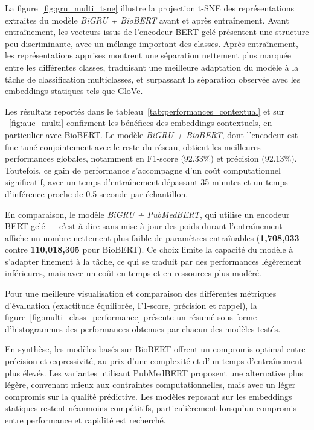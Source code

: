 \documentclass[12pt]{report}
\begin{document}
La figure~\ref{fig:gru_multi_tsne} illustre la projection t-SNE des représentations extraites du modèle \textit{BiGRU + BioBERT} avant et après entraînement. Avant entraînement, les vecteurs issus de l’encodeur BERT gelé présentent une structure peu discriminante, avec un mélange important des classes. Après entraînement, les représentations apprises montrent une séparation nettement plus marquée entre les différentes classes, traduisant une meilleure adaptation du modèle à la tâche de classification multiclasses, et surpassant la séparation observée avec les embeddings statiques tels que GloVe.

Les résultats reportés dans le tableau~\ref{tab:performances_contextual} et sur ~\ref{fig:auc_multi} confirment les bénéfices des embeddings contextuels, en particulier avec BioBERT. Le modèle \textit{BiGRU + BioBERT}, dont l’encodeur est fine-tuné conjointement avec le reste du réseau, obtient les meilleures performances globales, notamment en F1-score (92.33\%) et précision (92.13\%). Toutefois, ce gain de performance s’accompagne d’un coût computationnel significatif, avec un temps d’entraînement dépassant 35 minutes et un temps d’inférence proche de 0.5 seconde par échantillon.

En comparaison, le modèle \textit{BiGRU + PubMedBERT}, qui utilise un encodeur BERT gelé — c’est-à-dire sans mise à jour des poids durant l’entraînement — affiche un nombre nettement plus faible de paramètres entraînables (\textbf{1,708,033} contre \textbf{110,018,305} pour BioBERT). Ce choix limite la capacité du modèle à s’adapter finement à la tâche, ce qui se traduit par des performances légèrement inférieures, mais avec un coût en temps et en ressources plus modéré.

Pour une meilleure visualisation et comparaison des différentes métriques d’évaluation (exactitude équilibrée, F1-score, précision et rappel), la figure~\ref{fig:multi_class_performance} présente un résumé sous forme d’histogrammes des performances obtenues par chacun des modèles testés.

En synthèse, les modèles basés sur BioBERT offrent un compromis optimal entre précision et expressivité, au prix d’une complexité et d’un temps d’entraînement plus élevés. Les variantes utilisant PubMedBERT proposent une alternative plus légère, convenant mieux aux contraintes computationnelles, mais avec un léger compromis sur la qualité prédictive. Les modèles reposant sur les embeddings statiques restent néanmoins compétitifs, particulièrement lorsqu’un compromis entre performance et rapidité est recherché.
\end{document}
